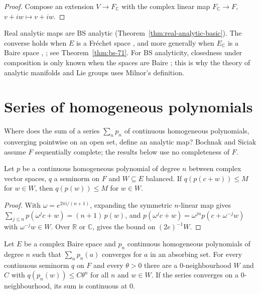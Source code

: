 \begin{proof}
  \leanok
  Compose an extension $V \to F_{\mathbb{C}}$ with the complex linear map
  $F_{\mathbb{C}} \to F$, $v + iw \mapsto v + iw$.
\end{proof}

\begin{remark}
  Real analytic maps are BS analytic (Theorem~\ref{thm:real-analytic-basic}). The converse holds
  when $E$ is a Fréchet space \cite[Rem.~2.2.7]{GN26}, and more generally when $E_{\mathbb{C}}$ is
  a Baire space \cite[Thm.~7.1]{BS71b}, \cite[2.9]{Glo02}; see Theorem~\ref{thm:bs-71}. For BS analyticity, closedness under
  composition is only known when the spaces are Baire \cite[Thm.~7.3]{BS71b}; this is why the
  theory of analytic manifolds and Lie groups uses Milnor's definition.
\end{remark}

\section{Series of homogeneous polynomials}

Where does the sum of a series $\sum_n p_n$ of continuous homogeneous polynomials, converging
pointwise on an open set, define an analytic map? Bochnak and Siciak \cite[\S5]{BS71b} assume
$F$ sequentially complete; the results below use no completeness of $F$.

\begin{lemma}
  \label{lem:hom-poly-shift}
  \leanok
  Let $p$ be a continuous homogeneous polynomial of degree $n$ between complex vector spaces,
  $q$ a seminorm on $F$ and $W \subseteq E$ balanced. If $q(p(c + w)) \le M$ for $w \in W$, then
  $q(p(w)) \le M$ for $w \in W$.
\end{lemma}

\begin{proof}
  \leanok
  With $\omega = e^{2\pi i/(n+1)}$, expanding the symmetric $n$-linear map gives
  $\sum_{j \le n} p(\omega^j c + w) = (n+1)\, p(w)$, and
  $p(\omega^j c + w) = \omega^{jn} p(c + \omega^{-j} w)$ with $\omega^{-j} w \in W$. Over
  $\mathbb{R}$ or $\mathbb{C}$, \cite[Lemma~2 (ii)]{BS71a} gives the bound on $(2e)^{-1} W$.
\end{proof}

\begin{proposition}
  \label{prop:bs-baire}
  \leanok
  Let $E$ be a complex Baire space and $p_n$ continuous homogeneous polynomials of degree $n$
  such that $\sum_n p_n(a)$ converges for $a$ in an absorbing set. For every continuous
  seminorm $q$ on $F$ and every $\theta > 0$ there are a $0$-neighbourhood $W$ and $C$ with
  $q(p_n(w)) \le C \theta^n$ for all $n$ and $w \in W$. If the series converges on a
  $0$-neighbourhood, its sum is continuous at $0$.
\end{proposition}

